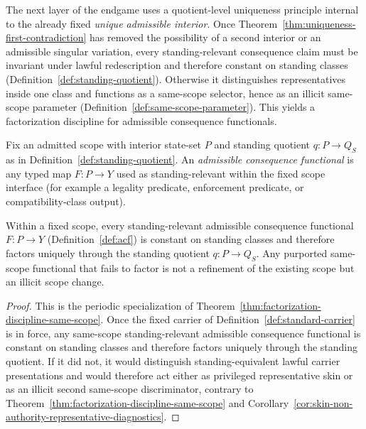 The next layer of the endgame uses a quotient-level uniqueness principle internal to the already fixed \emph{unique admissible interior}. Once Theorem~\ref{thm:uniqueness-first-contradiction} has removed the possibility of a second interior or an admissible singular variation, every standing-relevant consequence claim must be invariant under lawful redescription and therefore constant on standing classes (Definition~\ref{def:standing-quotient}). Otherwise it distinguishes representatives inside one class and functions as a same-scope selector, hence as an illicit same-scope parameter (Definition~\ref{def:same-scope-parameter}). This yields a factorization discipline for admissible consequence functionals.

\begin{definition}\label{def:acf}
Fix an admitted scope with interior state-set $P$ and standing quotient $q:P\to Q_S$ as in
Definition~\ref{def:standing-quotient}. An
\emph{admissible consequence functional} is any typed map $F:P\to Y$ used as standing-relevant
within the fixed scope interface (for example a legality predicate, enforcement predicate,
or compatibility-class output).
\end{definition}

\begin{proposition}\label{prop:factorization-discipline-NS}
Within a fixed scope, every standing-relevant admissible consequence functional $F:P\to Y$
(Definition~\ref{def:acf}) is constant on standing classes and therefore factors uniquely through the
standing quotient $q:P\to Q_S$.
Any purported same-scope functional that fails to factor is not a refinement of the existing scope
but an illicit scope change.
\end{proposition}

\begin{proof}
This is the periodic specialization of Theorem~\ref{thm:factorization-discipline-same-scope}. Once the fixed carrier of Definition~\ref{def:standard-carrier} is in force, any same-scope standing-relevant admissible consequence functional is constant on standing classes and therefore factors uniquely through the standing quotient. If it did not, it would distinguish standing-equivalent lawful carrier presentations and would therefore act either as privileged representative skin or as an illicit second same-scope discriminator, contrary to Theorem~\ref{thm:factorization-discipline-same-scope} and Corollary~\ref{cor:skin-non-authority-representative-diagnostics}.
\end{proof}


